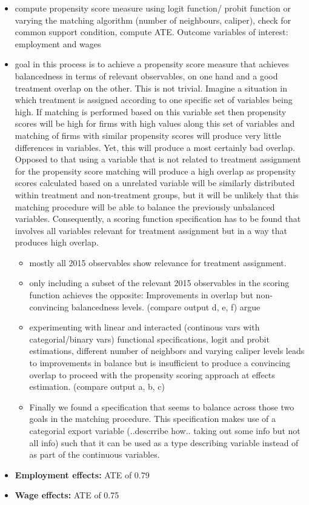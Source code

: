 \documentclass[11pt,a4paper,leqno]{article}
\begin{document}
\begin{itemize}
	\item compute propensity score measure using logit function/ probit function or varying the matching algorithm (number of neighbours, caliper), check for common support condition, compute ATE. Outcome variables of interest: employment and wages
	\item goal in this process is to achieve a propensity score measure that achieves balancedness in terms of relevant observables, on one hand and a good treatment overlap on the other. This is not trivial. Imagine a situation in which treatment is assigned according to one specific set of variables being high. If matching is performed based on this variable set then propensity scores will be high for firms with high values along this set of variables and matching of firms with similar propensity scores will produce very little differences in variables. Yet, this will produce a most certainly bad overlap. Opposed to that using a variable that is not related to treatment assignment for the propensity score matching will produce a high overlap as propensity scores calculated based on a unrelated variable will be similarly distributed within treatment and non-treatment groups, but it will be unlikely that this matching procedure will be able to balance the previously unbalanced variables. Consequently, a scoring function specification has to be found that involves all variables relevant for treatment assignment but in a way that produces high overlap.
	\begin{itemize}
		\item mostly all 2015 observables show relevance for treatment assignment. 
		\item only including a subset of the relevant 2015 observables in the scoring function achieves the opposite: Improvements in overlap but non-convincing balancedness levels. (compare output d, e, f) argue 
		\item experimenting with linear and interacted (continous vars with categorial/binary vars) functional specifications, logit and probit estimations, different number of neighbors and varying caliper levels leads to improvements in balance but is insufficient to produce a convincing overlap to proceed with the propensity scoring approach at effects estimation. (compare output a, b, c)
		
		\item Finally we found a specification that seems to balance across those two goals in the matching procedure. This specification makes use of a categorial export variable (..descrribe how.. taking out some info but not all info) such that it can be used as a type describing variable instead of as part of the continuous variables.  
	\end{itemize}
	\item \textbf{Employment effects:} ATE of 0.79
	\item \textbf{Wage effects:} ATE of 0.75
	

\end{itemize}
\end{document}
